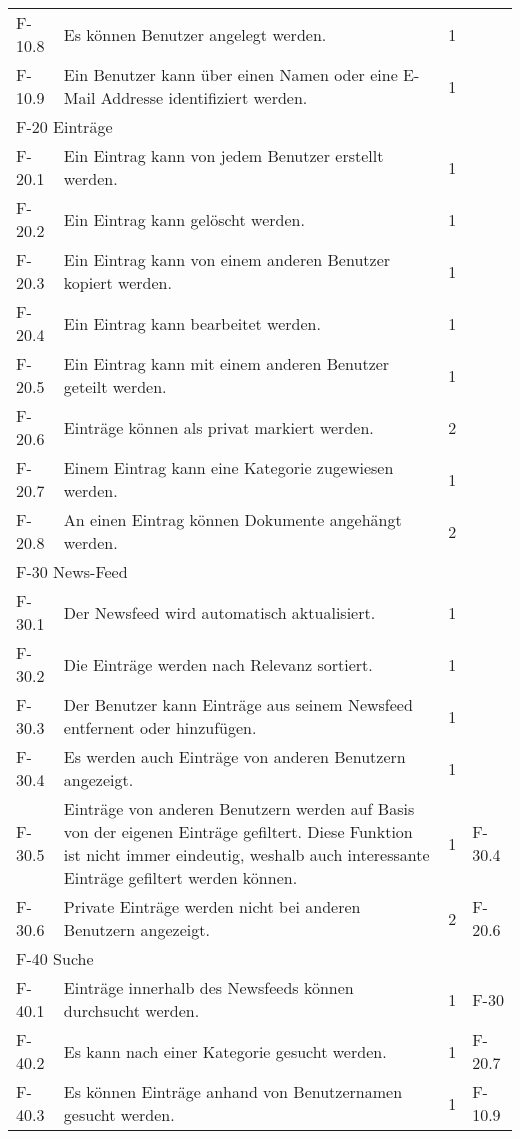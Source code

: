 \begin{tabularx}{\textwidth}{|l|X|l|l|}
    F-10.8 & Es können Benutzer angelegt werden. & 1 &\\
    F-10.9 & Ein Benutzer kann über einen Namen oder eine E-Mail Addresse identifiziert werden. & 1 &\\
    \hline
    \multicolumn{4}{|l|}{F-20 Einträge}\\
    \hline
    F-20.1 & Ein Eintrag kann von jedem Benutzer erstellt werden. & 1 & \\
    F-20.2 & Ein Eintrag kann gelöscht werden. & 1 & \\
    F-20.3 & Ein Eintrag kann von einem anderen Benutzer kopiert werden. & 1 & \\
    F-20.4 & Ein Eintrag kann bearbeitet werden. & 1 & \\
    F-20.5 & Ein Eintrag kann mit einem anderen Benutzer geteilt werden. & 1 & \\
    F-20.6 & Einträge können als privat markiert werden. & 2 &\\
    F-20.7 & Einem Eintrag kann eine Kategorie zugewiesen werden. & 1 & \\
    F-20.8 & An einen Eintrag können Dokumente angehängt werden. & 2 & \\
    \hline
    \multicolumn{4}{|l|}{F-30 News-Feed}\\
    \hline
    F-30.1 & Der Newsfeed wird automatisch aktualisiert. & 1 & \\
    F-30.2 & Die Einträge werden nach Relevanz sortiert. & 1 & \\
    F-30.3 & Der Benutzer kann Einträge aus seinem Newsfeed entfernent oder hinzufügen. & 1 & \\
    F-30.4 & Es werden auch Einträge von anderen Benutzern angezeigt. & 1 & \\
    F-30.5 & Einträge von anderen Benutzern werden auf Basis von der eigenen Einträge gefiltert. Diese Funktion ist nicht immer eindeutig, weshalb auch interessante Einträge gefiltert werden können. & 1 & F-30.4\\
    F-30.6 & Private Einträge werden nicht bei anderen Benutzern angezeigt. & 2 & F-20.6\\
    \hline
    \multicolumn{4}{|l|}{F-40 Suche}\\
    \hline
    F-40.1 & Einträge innerhalb des Newsfeeds können durchsucht werden. & 1 & F-30\\
    F-40.2 & Es kann nach einer Kategorie gesucht werden. & 1 & F-20.7\\
    F-40.3 & Es können Einträge anhand von Benutzernamen gesucht werden. & 1 & F-10.9\\

\end{tabularx}

